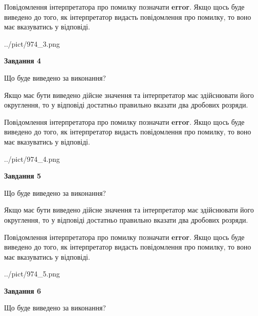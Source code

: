 \documentclass[12pt, ukrainian]{article}
\begin{document}
{\begin {Large}
Повідомлення інтерпретатора про помилку позначати \textbf{error}.
Якщо щось буде виведено до того, як інтерпретатор видасть повідомлення про помилку, 
то воно має вказуватись у відповіді. \par

\begin{center}
	{../pict/974_3.png}
\end{center}
\newpage

{\begin {center}\textbf{Завдання 4}\end {center}}\par
Що буде виведено за виконання? \par

Якщо має бути виведено дійсне значення та інтерпретатор має здійснювати його округлення, 
то у відповіді достатньо правильно вказати два дробових розряди.

Повідомлення інтерпретатора про помилку позначати \textbf{error}.
Якщо щось буде виведено до того, як інтерпретатор видасть повідомлення про помилку, 
то воно має вказуватись у відповіді. \par

\begin{center}
	{../pict/974_4.png}
\end{center}
\newpage

{\begin {center}\textbf{Завдання 5}\end {center}}\par
Що буде виведено за виконання? \par

Якщо має бути виведено дійсне значення та інтерпретатор має здійснювати його округлення, 
то у відповіді достатньо правильно вказати два дробових розряди.

Повідомлення інтерпретатора про помилку позначати \textbf{error}.
Якщо щось буде виведено до того, як інтерпретатор видасть повідомлення про помилку, 
то воно має вказуватись у відповіді. \par

\begin{center}
	{../pict/974_5.png}
\end{center}
\newpage

{\begin {center}\textbf{Завдання 6}\end {center}}\par
Що буде виведено за виконання? \par


\end{Large}}
\end{document}
